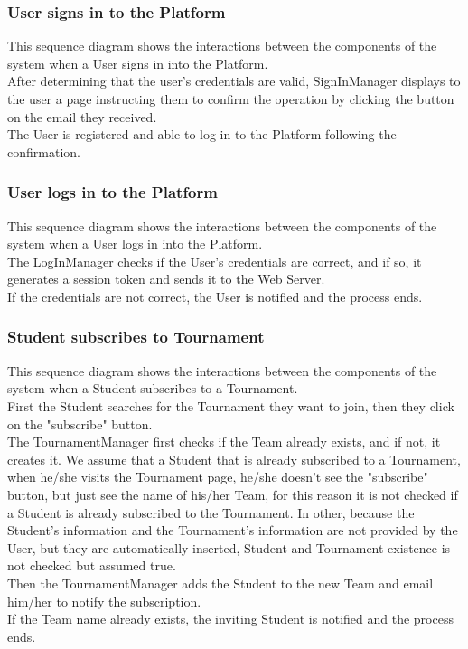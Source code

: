 \begin{landscape}

\clearpage
\subsubsection{User signs in to the Platform} \label{sq:2}
This sequence diagram shows the interactions between the components of the system when a User signs in into the Platform.\\
After determining that the user's credentials are valid, SignInManager displays to the user a page instructing them to confirm the operation by clicking the button on the email they received.\\
The User is registered and able to log in to the Platform following the confirmation.

\clearpage
\subsubsection{User logs in to the Platform} \label{sq:3}
This sequence diagram shows the interactions between the components of the system when a User logs in into the Platform.\\
The LogInManager checks if the User's credentials are correct, and if so, it generates a session token and sends it to the Web Server.\\
If the credentials are not correct, the User is notified and the process ends.

\clearpage
\subsubsection{Student subscribes to Tournament} \label{sq:4}
This sequence diagram shows the interactions between the components of the system when a Student subscribes to a Tournament.\\
First the Student searches for the Tournament they want to join, then they click on the "subscribe" button.\\
The TournamentManager first checks if the Team already exists, and if not, it creates it. We assume that a Student that is already subscribed to a Tournament, when he/she visits the Tournament page, he/she doesn't see the "subscribe" 
button, but just see the name of his/her Team, for this reason it is not checked if a Student is already subscribed to the Tournament. In other, because the Student's information and the Tournament's information are not provided by the 
User, but they are automatically inserted, Student and Tournament existence is not checked but assumed true.\\
Then the TournamentManager adds the Student to the new Team and email him/her to notify the subscription.\\
If the Team name already exists, the inviting Student is notified and the process ends.\\


\end{landscape}
